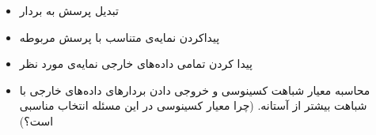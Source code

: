 \begin{enumerate}
	\begin{itemize}
		\item تبدیل پرسش به بردار
		\item پیداکردن نمایه‌ی متناسب با پرسش مربوطه
		\item پیدا کردن تمامی داده‌های خارجی نمایه‌ی مورد نظر
		\item محاسبه معیار شباهت کسینوسی و خروجی دادن بردار‌های داده‌های خارجی با شباهت بیشتر از آستانه. (چرا معیار کسینوسی در این مسئله انتخاب مناسبی است؟)
	\end{itemize}
\end{enumerate}


%
%
%
%	
%	
%	
%	
%	
%	
%	
%
%
%
%
